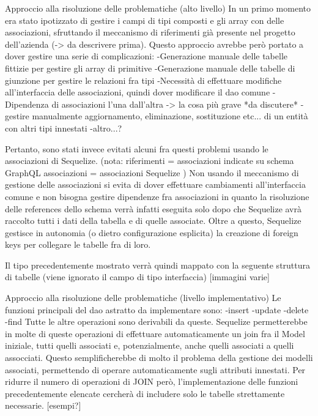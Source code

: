     Approccio alla risoluzione delle problematiche (alto livello)
        In un primo momento era stato ipotizzato di gestire i campi di tipi composti e gli array con delle associazioni, sfruttando il meccanismo di riferimenti già presente nel progetto dell'azienda (-> da descrivere prima).
        Questo approccio avrebbe però portato a dover gestire una serie di complicazioni:
            -Generazione manuale delle tabelle fittizie per gestire gli array di primitive
            -Generazione manuale delle tabelle di giunzione per gestire le relazioni fra tipi
            -Necessità di effettuare modifiche all'interfaccia delle associazioni, quindi dover modificare il dao comune
            -Dipendenza di associazioni l'una dall'altra -> la cosa più grave *da discutere*
            -gestire manualmente aggiornamento, eliminazione, sostituzione etc... di un entità con altri tipi innestati
            -altro...?
        
        Pertanto, sono stati invece evitati alcuni fra questi problemi usando le associazioni di Sequelize.
        (nota: riferimenti = associazioni indicate su schema GraphQL
               associazioni = associazioni Sequelize
        )
        Non usando il meccanismo di gestione delle associazioni si evita di dover effettuare cambiamenti all'interfaccia comune e non bisogna gestire dipendenze fra associazioni in quanto la risoluzione delle references dello schema verrà infatti eseguita solo dopo che Sequelize avrà raccolto tutti i dati della tabella e di quelle associate.
        Oltre a questo, Sequelize gestisce in autonomia (o dietro configurazione esplicita) la creazione di foreign keys per collegare le tabelle fra di loro.

        Il tipo precedentemente mostrato verrà quindi mappato con la seguente struttura di tabelle (viene ignorato il campo di tipo interfaccia)
        [immagini varie]

    Approccio alla risoluzione delle problematiche (livello implementativo)
        Le funzioni principali del dao astratto da implementare sono:
            -insert
            -update
            -delete
            -find
        Tutte le altre operazioni sono derivabili da queste.
        Sequelize permetterebbe in molte di queste operazioni di effettuare automaticamente un join fra il Model iniziale, tutti quelli associati e, potenzialmente, anche quelli associati a quelli assocciati.
        Questo semplificherebbe di molto il problema della gestione dei modelli associati, permettendo di operare automaticamente sugli attributi innestati.
        Per ridurre il numero di operazioni di JOIN però, l'implementazione delle funzioni precedentemente elencate cercherà di includere solo le tabelle strettamente necessarie.
        [esempi?]

